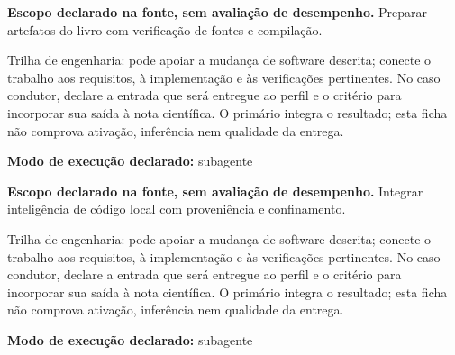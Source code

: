 
\begin{descricao}
\textbf{Escopo declarado na fonte, sem avaliação de desempenho.}
Preparar artefatos do livro com verificação de fontes e compilação.
\end{descricao}

\begin{funcao}
Trilha de engenharia: pode apoiar a mudança de software descrita; conecte o trabalho aos requisitos, à implementação e às verificações pertinentes. No caso condutor, declare a entrada que será entregue ao perfil e o critério para incorporar sua saída à nota científica. O primário integra o resultado; esta ficha não comprova ativação, inferência nem qualidade da entrega.
\end{funcao}

\begin{arquitetura}
\textbf{Modo de execução declarado:} subagente
\end{arquitetura}


\begin{descricao}
\textbf{Escopo declarado na fonte, sem avaliação de desempenho.}
Integrar inteligência de código local com proveniência e confinamento.
\end{descricao}

\begin{funcao}
Trilha de engenharia: pode apoiar a mudança de software descrita; conecte o trabalho aos requisitos, à implementação e às verificações pertinentes. No caso condutor, declare a entrada que será entregue ao perfil e o critério para incorporar sua saída à nota científica. O primário integra o resultado; esta ficha não comprova ativação, inferência nem qualidade da entrega.
\end{funcao}

\begin{arquitetura}
\textbf{Modo de execução declarado:} subagente
\end{arquitetura}


